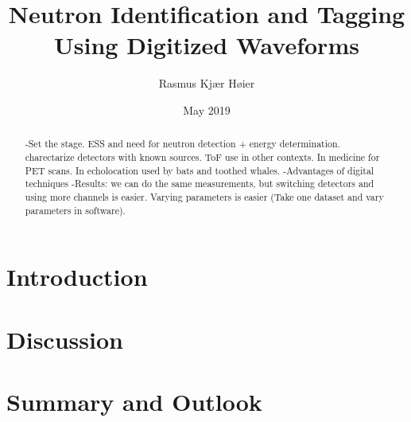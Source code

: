 \documentclass[12pt]{article}
\title{Neutron Identification and Tagging Using Digitized Waveforms}
\author{Rasmus Kjær Høier}
\date{May 2019}
\begin{document}
\maketitle

\tableofcontents

\begin{abstract}
-Set the stage. ESS and need for neutron detection + energy determination. charectarize detectors with known sources. ToF use in other contexts. In medicine for PET scans. In echolocation used by bats and toothed whales.
-Advantages of digital techniques
-Results: we can do the same measurements, but switching detectors and using more channels is easier. Varying parameters is easier (Take one dataset and vary parameters in software).\cite{Leo}
\end{abstract}
\newpage

\section{Introduction}
\clearpage
\clearpage
\clearpage
\clearpage
\clearpage
\clearpage
\section{Discussion}%
\section{Summary and Outlook}%
\clearpage

\end{document}
